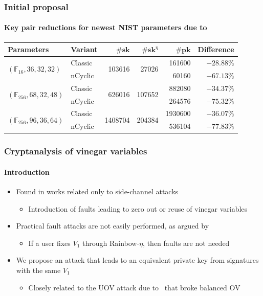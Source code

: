 \documentclass[12pt]{beamer}
\begin{document}
\begin{frame}
  \frametitle{Initial proposal}
  \framesubtitle{Key pair reductions for newest NIST
    parameters due to~\cite{Ding:202006}}
  \begin{table}[htbp]
    \renewcommand{\arraystretch}{1.2}
    \centering
    \footnotesize
    \begin{tabular}{*{2}{l}*{4}{r}}
      \toprule
      Parameters & Variant & $\#\textbf{sk}$ & $\#\textbf{sk}^{\eta}$
        & $\#\textbf{pk}$ & Difference \\ \midrule
      \multirow{2}{*}{\scriptsize{$(\mathbb{F}_{ 16}, 36, 32, 32)$}}
        & Classic & \multirow{2}{*}{\num{ 103616}}
        & \multirow{2}{*}{\num{  27026}} & \num{  161600} & $-28.88\%$ \\
      & nCyclic & & & \num{   60160} & $-67.13\%$ \\
      \multirow{2}{*}{\scriptsize{$(\mathbb{F}_{256}, 68, 32, 48)$}}
        & Classic & \multirow{2}{*}{\num{ 626016}}
        & \multirow{2}{*}{\num{ 107652}} & \num{  882080} & $-34.37\%$ \\
      & nCyclic & & & \num{  264576} & $-75.32\%$ \\
      \multirow{2}{*}{\scriptsize{$(\mathbb{F}_{256}, 96, 36, 64)$}}
        & Classic & \multirow{2}{*}{\num{1408704}}
        & \multirow{2}{*}{\num{ 204384}} & \num{ 1930600} & $-36.07\%$ \\
      & nCyclic & & & \num{  536104} & $-77.83\%$ \\
      \bottomrule
    \end{tabular}
  \end{table}
\end{frame}

\begin{frame}
  \frametitle{Cryptanalysis of vinegar variables}
  \framesubtitle{Introduction}
  \begin{itemize}
    \item Found in works related only to side-channel attacks
    \begin{itemize}
      \item Introduction of faults leading to zero out or reuse of vinegar
          variables
    \end{itemize}
    \item Practical fault attacks are not easily performed, as argued
        by~\cite{Mus:202011}
    \begin{itemize}
      \item If a user fixes $V_{1}$ through Rainbow-$\eta$, then faults are not
          needed
    \end{itemize}
    \item We propose an attack that leads to an equivalent
        private key from signatures with the same $V_{1}$
    \begin{itemize}
      \item Closely related to the UOV attack due to~\cite{Kipnis:199904}
          that broke balanced OV
    \end{itemize}
  \end{itemize}
\end{frame}
\end{document}
